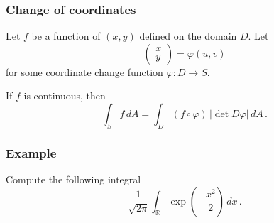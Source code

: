 \documentclass[aspectratio=169]{beamer}
\newcommand{\R}{\mathbb{R}}
\begin{document}
\begin{frame}
    \frametitle{Change of coordinates}
    Let $f$ be a function of  $(x,y)$ defined on the domain $D$. 
    Let 
    \begin{equation*}
        \begin{pmatrix}
            x \\ y
        \end{pmatrix}
         = \varphi(u,v)
    \end{equation*}
    for some coordinate change function $\varphi: D \to S$.
    \begin{theorem}
        If $f$ is continuous, then
        \begin{equation*}
            \int_S f \, dA = \int_D (f\circ \varphi) \,|\det D \varphi| \, dA \,.
        \end{equation*}
    \end{theorem}
\end{frame}


\begin{frame}
    \frametitle{Example}
    Compute the following integral
    \begin{equation*}
        \frac{1}{\sqrt{2\pi}}\int_{\R} \exp\left(-\frac{x^2}{2}\right) \, dx \,.
    \end{equation*}
\end{frame}
\end{document}
